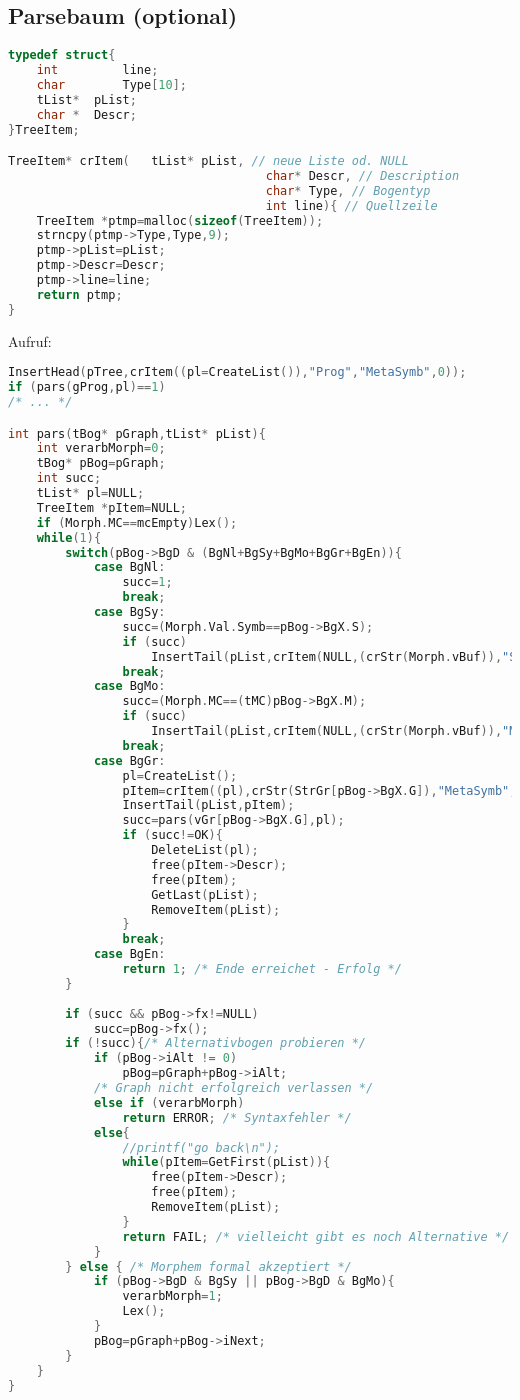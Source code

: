 \subsection{Parsebaum (optional)}
\begin{lstlisting}[language=C]
typedef struct{
	int 		line;
	char 		Type[10];
	tList* 	pList;
	char * 	Descr;
}TreeItem;

TreeItem* crItem(	tList* pList, // neue Liste od. NULL
									char* Descr, // Description
									char* Type, // Bogentyp
									int line){ // Quellzeile
	TreeItem *ptmp=malloc(sizeof(TreeItem));
	strncpy(ptmp->Type,Type,9);
	ptmp->pList=pList;
	ptmp->Descr=Descr;
	ptmp->line=line;
	return ptmp;
}
\end{lstlisting}
Aufruf:
\begin{lstlisting}[language=C]
InsertHead(pTree,crItem((pl=CreateList()),"Prog","MetaSymb",0));
if (pars(gProg,pl)==1)
/* ... */

int pars(tBog* pGraph,tList* pList){
	int verarbMorph=0;
	tBog* pBog=pGraph;
	int succ;
	tList* pl=NULL;
	TreeItem *pItem=NULL;
	if (Morph.MC==mcEmpty)Lex();
	while(1){
		switch(pBog->BgD & (BgNl+BgSy+BgMo+BgGr+BgEn)){
			case BgNl:
				succ=1;
				break;
			case BgSy:
				succ=(Morph.Val.Symb==pBog->BgX.S);
				if (succ)
					InsertTail(pList,crItem(NULL,(crStr(Morph.vBuf)),"Symbol",Morph.PosLine));
				break;
			case BgMo:
				succ=(Morph.MC==(tMC)pBog->BgX.M);
				if (succ)
					InsertTail(pList,crItem(NULL,(crStr(Morph.vBuf)),"Morph",Morph.PosLine));
				break;
			case BgGr:
				pl=CreateList();
				pItem=crItem((pl),crStr(StrGr[pBog->BgX.G]),"MetaSymb",Morph.PosLine);
				InsertTail(pList,pItem);
				succ=pars(vGr[pBog->BgX.G],pl);
				if (succ!=OK){
					DeleteList(pl); 
					free(pItem->Descr);
					free(pItem); 
					GetLast(pList); 
					RemoveItem(pList);
				}
				break;
			case BgEn:
				return 1; /* Ende erreichet - Erfolg */
		}
		
		if (succ && pBog->fx!=NULL)
			succ=pBog->fx();
		if (!succ){/* Alternativbogen probieren */
			if (pBog->iAlt != 0)
				pBog=pGraph+pBog->iAlt;
			/* Graph nicht erfolgreich verlassen */
			else if (verarbMorph)
				return ERROR; /* Syntaxfehler */
			else{
				//printf("go back\n");
				while(pItem=GetFirst(pList)){
					free(pItem->Descr);
					free(pItem);
					RemoveItem(pList);
				}
				return FAIL; /* vielleicht gibt es noch Alternative */
			}
		} else { /* Morphem formal akzeptiert */
			if (pBog->BgD & BgSy || pBog->BgD & BgMo){
				verarbMorph=1;
				Lex();
			}
			pBog=pGraph+pBog->iNext;
		}
	}
}
\end{lstlisting}

